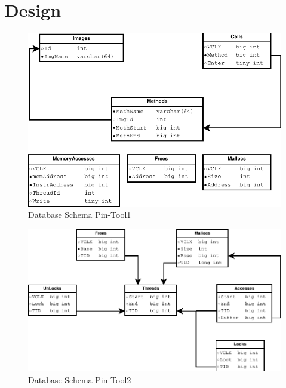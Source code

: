 \section{Design}

\begin{figure}
  \includegraphics[width=\columnwidth]{database_schema1}
  \caption{Database Schema Pin-Tool1}
  \label{pic:db_schema1}
\end{figure}


\begin{figure}
  \includegraphics[width=\columnwidth]{database_schema2}
  \caption{Database Schema Pin-Tool2}
  \label{pic:db_schema1}
\end{figure}
